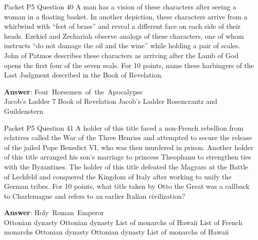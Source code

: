 \begin{frame}{Packet P5 Question 40}
A man has a vision of   these characters after seeing a woman in a floating basket. In another depiction, these characters arrive from a whirlwind with ``feet of brass'' and reveal a different face on each side of their heads. Ezekiel and Zechariah observe analogs of these characters, one of whom instructs “do not damage the oil and the wine” while holding a pair of scales. John of Patmos describes these characters as arriving after the Lamb of God opens the first four of the seven seals. For 10 points, name these harbingers of the Last Judgment described in the Book of Revelation.        

\textbf{Answer}: Four\ Horsemen\ of\ the\ Apocalypse\\
 Jacob's Ladder
 7
 Book of Revelation
 Jacob's Ladder
 Rosencrantz and Guildenstern
\end{frame}

\begin{frame}{Packet P5 Question 41}
A holder of this title faced a non-French rebellion from relatives called the War of the Three Henries and attempted to secure the release of the jailed Pope Benedict VI, who was then murdered in prison. Another holder of this title arranged his son’s marriage to princess Theophanu to strengthen ties with the Byzantines. The holder of this title defeated the Magyars at the Battle of Lechfeld and conquered     the Kingdom of   Italy after working to unify the German tribes. For 10 points, what title taken by Otto the Great was a callback to Charlemagne and refers to an earlier Italian civilization?        

\textbf{Answer}: Holy\ Roman\ Emperor\\
 Ottonian dynasty
 Ottonian dynasty
 List of monarchs of Hawaii
 List of French monarchs
 Ottonian dynasty
 Ottonian dynasty
 List of monarchs of Hawaii
\end{frame}

